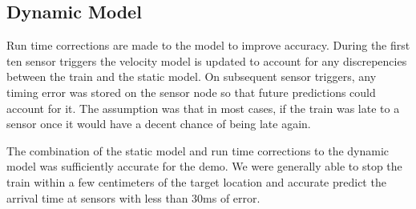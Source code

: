 \documentclass[twoside,a4paper]{refart}
\begin{document}
\subsection{Dynamic Model}

Run time corrections are made to the model to improve accuracy. During the first ten sensor triggers the velocity model is updated to account for any discrepencies between the train and the static model. On subsequent sensor triggers, any timing error was stored on the sensor node so that future predictions could account for it. The assumption was that in most cases, if the train was late to a sensor once it would have a decent chance of being late again.

The combination of the static model and run time corrections to the dynamic model was sufficiently accurate for the demo. We were generally able to stop the train within a few centimeters of the target location and accurate predict the arrival time at sensors with less than 30ms of error.
\end{document}
